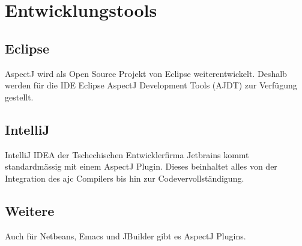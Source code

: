 \section{Entwicklungstools}
\subsection{Eclipse}
AspectJ wird als Open Source Projekt von Eclipse weiterentwickelt. Deshalb werden für die IDE Eclipse AspectJ Development Tools (AJDT) zur Verfügung gestellt. \cite{eclipse:ajdt}
\subsection{IntelliJ}
IntelliJ IDEA der Tschechischen Entwicklerfirma Jetbrains kommt standardmässig mit einem AspectJ Plugin. Dieses beinhaltet alles von der Integration des ajc Compilers bis hin zur Codevervollständigung.
\subsection{Weitere}
Auch für Netbeans, Emacs und JBuilder gibt es AspectJ Plugins.